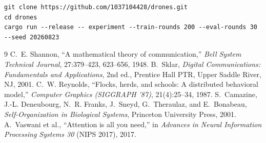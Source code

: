 \documentclass[12pt,a4paper]{article}
\begin{document}
\begin{verbatim}
git clone https://github.com/1037104428/drones.git
cd drones
cargo run --release -- experiment --train-rounds 200 --eval-rounds 30 --seed 20260823
\end{verbatim}

\begin{thebibliography}{9}
C.~E. Shannon, ``A mathematical theory of communication,'' {\em Bell System Technical Journal}, 27:379--423, 623--656, 1948.
B.~Sklar, {\em Digital Communications: Fundamentals and Applications}, 2nd ed., Prentice Hall PTR, Upper Saddle River, NJ, 2001.
C.~W. Reynolds, ``Flocks, herds, and schools: A distributed behavioral model,'' {\em Computer Graphics (SIGGRAPH '87)}, 21(4):25--34, 1987.
S.~Camazine, J.-L. Deneubourg, N.~R. Franks, J.~Sneyd, G.~Theraulaz, and E.~Bonabeau, {\em Self-Organization in Biological Systems}, Princeton University Press, 2001.
A.~Vaswani et al., ``Attention is all you need,'' in {\em Advances in Neural Information Processing Systems 30} (NIPS 2017), 2017.
\end{thebibliography}
\end{document}
